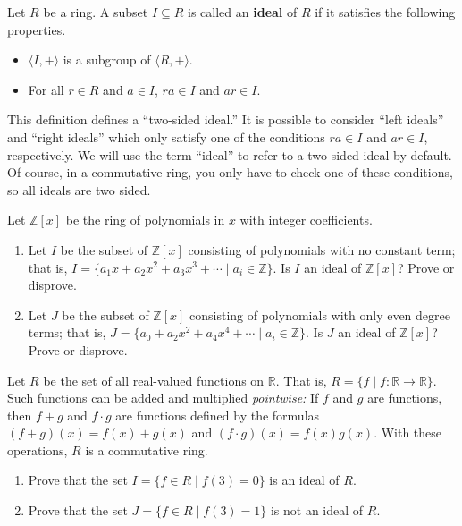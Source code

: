 \begin{definition}
Let \(R\) be a ring. A subset \(I \subseteq R\) is called an \textbf{ideal} of \(R\) if it satisfies the following properties.
\begin{itemize}
  \item \(\langle I, +\rangle \) is a subgroup of \(\langle R, + \rangle \).
  \item For all \(r \in R\) and \(a \in I\), \(ra \in I\) and \(ar \in I\).
\end{itemize}
\end{definition}

This definition defines a ``two-sided ideal.'' It is possible to consider ``left ideals'' and ``right ideals'' which only satisfy one of the conditions \(ra \in I\) and \(ar \in I\), respectively. We will use the term ``ideal'' to refer to a two-sided ideal by default. Of course, in a commutative ring, you only have to check one of these conditions, so all ideals are two sided.

\begin{problem}
Let \(\mathbb{Z}[x]\) be the ring of polynomials in \(x\) with integer coefficients.
\begin{enumerate}
  \item Let \(I\) be the subset of \(\mathbb{Z}[x]\) consisting of polynomials with no constant term; that is, \(I = \{a_1x+a_2x^2+a_3x^3 + \cdots \mid a_i \in \mathbb{Z} \}\). Is \(I\) an ideal of \(\mathbb{Z}[x]\)? Prove or disprove.
  \item Let \(J\) be the subset of \(\mathbb{Z}[x]\) consisting of polynomials with only even degree terms; that is, \(J = \{a_0+a_2x^2+a_4x^4 + \cdots \mid a_i \in \mathbb{Z} \}\). Is \(J\) an ideal of \(\mathbb{Z}[x]\)? Prove or disprove.
\end{enumerate}
\end{problem}

\begin{problem}
Let \(R\) be the set of all real-valued functions on \(\mathbb{R}\). That is, \(R = \{ f \mid f : \mathbb{R}\longrightarrow \mathbb{R} \} \). Such functions can be added and multiplied \emph{pointwise:} If \(f\) and \(g\) are functions, then \(f+g\) and \(f\cdot g\) are functions defined by the formulas \((f+g)(x) = f(x)+g(x)\) and \((f\cdot g)(x) = f(x)g(x) \). With these operations, \(R\) is a commutative ring.
\begin{enumerate}
  \item Prove that the set \(I = \{ f \in R \mid f(3)=0\} \) is an ideal of \(R\).
  \item Prove that the set \(J = \{ f \in R \mid f(3)=1\} \) is not an ideal of \(R\).
\end{enumerate}
\end{problem}

